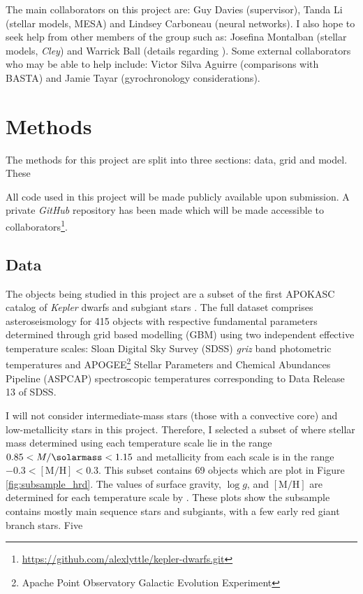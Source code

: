 \documentclass[twocolumn]{aastex63}
\newcommand{\metallicity}{[\mathrm{M} / \mathrm{H}]}
\begin{document}
The main collaborators on this project are: Guy Davies (supervisor), Tanda Li (stellar models, MESA) and Lindsey Carboneau (neural networks). I also hope to seek help from other members of the group such as: Josefina Montalban (stellar models, \textit{Cley}) and Warrick Ball (details regarding ). Some external collaborators who may be able to help include: Victor Silva Aguirre (comparisons with BASTA) and Jamie Tayar (gyrochronology considerations).

\section{Methods}

The methods for this project are split into three sections: data, grid and model. These

All code used in this project will be made publicly available upon submission. A private \textit{GitHub} repository has been made which will be made accessible to collaborators\footnote{\url{https://github.com/alexlyttle/kepler-dwarfs.git}}. 

\subsection{Data}\label{sec:data}

The objects being studied in this project are a subset of the first APOKASC catalog of \textit{Kepler} dwarfs and subgiant stars \citep[][hereafter ]{Serenelli.Johnson.ea2017}. The full dataset comprises asteroseismology for 415 objects with respective fundamental parameters determined through grid based modelling (GBM) using two independent effective temperature scales: Sloan Digital Sky Survey (SDSS) \textit{griz} band photometric temperatures and APOGEE\footnote{Apache Point Observatory Galactic Evolution
Experiment} Stellar Parameters and Chemical Abundances Pipeline (ASPCAP) spectroscopic temperatures corresponding to Data Release 13 of SDSS.

I will not consider intermediate-mass stars (those with a convective core) and low-metallicity stars in this project. Therefore, I selected a subset of  where stellar mass determined using each temperature scale lie in the range $0.85 < M/\si{\solarmass} < 1.15$ and metallicity from each scale is in the range $-0.3 < \metallicity < 0.3$. This subset contains 69 objects which are plot in Figure \ref{fig:subsample_hrd}. The values of surface gravity, $\log{g}$, and $\metallicity$ are determined for each temperature scale by . These plots show the subsample contains mostly main sequence stars and subgiants, with a few early red giant branch stars. Five 
\end{document}
